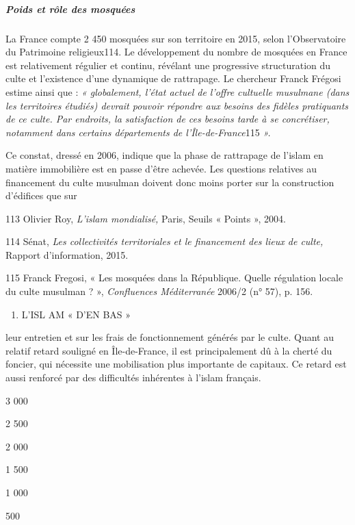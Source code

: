 \hypertarget{poids-et-ruxf4le-des-mosquuxe9es}{%
\subparagraph{Poids et rôle des
mosquées}\label{poids-et-ruxf4le-des-mosquuxe9es}}


La France compte 2 450 mosquées sur son territoire en 2015, selon
l'Observatoire du Patrimoine religieux114. Le développement du nombre de
mosquées en France est relativement régulier et continu, révélant une
progressive structuration du culte et l'existence d'une dynamique de
rattrapage. Le chercheur Franck Frégosi estime ainsi que : \emph{«
globalement, l'état actuel de l'offre cultuelle musulmane (dans les
territoires étudiés) devrait pouvoir répondre aux besoins des fidèles
pratiquants de ce culte. Par endroits, la satisfaction de ces besoins
tarde à se concrétiser, notamment dans certains départements de
l'Île-de-France}115 \emph{».}

Ce constat, dressé en 2006, indique que la phase de rattrapage de
l'islam en matière immobilière est en passe d'être achevée. Les
questions relatives au financement du culte musulman doivent donc moins
porter sur la construction d'édifices que sur

113 Olivier Roy, \emph{L'islam mondialisé,} Paris, Seuils « Points »,
2004.

114 Sénat, \emph{Les collectivités territoriales et le financement des
lieux de culte,} Rapport d'information, 2015.

115 Franck Fregosi, « Les mosquées dans la République. Quelle régulation
locale du culte musulman ? », \emph{Confluences Méditerranée} 2006/2 (n°
57), p. 156.


\begin{enumerate}
\def\labelenumi{\Roman{enumi}.}
\setcounter{enumi}{2}
\item
  
  L'ISL AM « D'EN BAS »
  
\end{enumerate}


leur entretien et sur les frais de fonctionnement générés par le culte.
Quant au relatif retard souligné en Île-de-France, il est principalement
dû à la cherté du foncier, qui nécessite une mobilisation plus
importante de capitaux. Ce retard est aussi renforcé par des difficultés
inhérentes à l'islam français.


3 000

2 500

2 000

1 500

1 000

500

